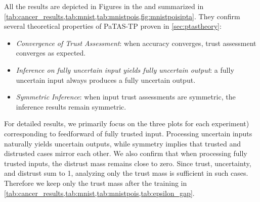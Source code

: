 All the results are depicted in Figures in the \appp and summarized in \cref{tab:cancer_results,tab:mnist,tab:mnistpois,fig:mnistpoisipta}. They confirm several theoretical properties of \ac{PaTAS-TP} proven in \cref{sec:ptastheory}:



\begin{itemize}
\item \emph{Convergence of Trust Assessment}: when accuracy converges, trust assessment converges as expected.
\item \emph{Inference on fully uncertain input yields fully uncertain output}: a fully uncertain input always produces a fully uncertain output.
\item \emph{Symmetric Inference}: when input trust assessments are symmetric, the inference results remain symmetric.
\end{itemize}

For detailed results, we primarily focus on the three plots for each experiment) corresponding to feedforward of fully trusted input. Processing uncertain inputs naturally yields uncertain outputs, while symmetry implies that trusted and distrusted cases mirror each other. We also confirm that when processing fully trusted inputs, the distrust mass remains close to zero. Since trust, uncertainty, and distrust sum to 1, analyzing only the trust mass is sufficient in such cases. Therefore we keep only the trust mass after the training in \cref{tab:cancer_results,tab:mnist,tab:mnistpois,tab:epsilon_gap}. 

